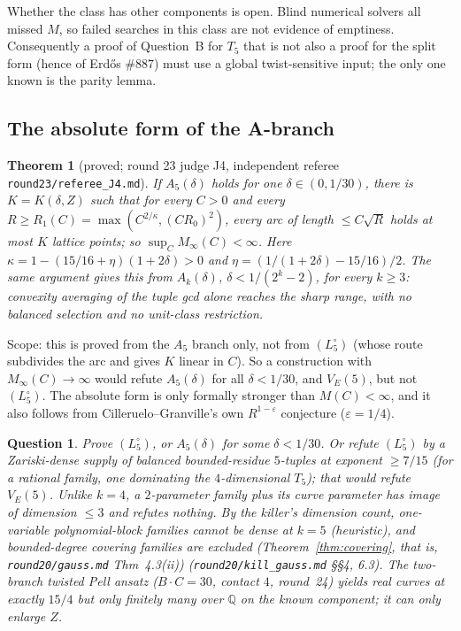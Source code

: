 \documentclass[11pt]{article}
\newtheorem{theorem}{Theorem}[section]
\newtheorem{question}{Question}
\newcommand{\Q}{\mathbb Q}
\newcommand{\rec}[1]{\texttt{#1}}
\begin{document}
Whether the class has other components is open.  Blind numerical solvers all
missed \(M\), so failed searches in this class are not evidence of emptiness.
Consequently a proof of Question~B for \(T_5\) that is not also a proof for
the split form (hence of Erd\H{o}s \#887) must use a global twist-sensitive
input; the only one known is the parity lemma.

\subsection{The absolute form of the A-branch}

\begin{theorem}[proved; round 23 judge J4, independent referee \rec{round23/referee\_J4.md}]\label{thm:absolute}
If \(A_5(\delta)\) holds for one \(\delta\in(0,1/30)\), there is
\(K=K(\delta,Z)\) such that for every \(C>0\) and every
\(R\ge R_1(C)=\max(C^{2/\kappa},(CR_0)^2)\), every arc of length
\(\le C\sqrt R\) holds at most \(K\) lattice points; so
\(\sup_C M_\infty(C)<\infty\).  Here \(\kappa=1-(15/16+\eta)(1+2\delta)>0\)
and \(\eta=(1/(1+2\delta)-15/16)/2\).  The same argument gives this from
\(A_k(\delta)\), \(\delta<1/(2^k-2)\), for every \(k\ge3\): convexity averaging
of the tuple gcd alone reaches the sharp range, with no balanced selection and
no unit-class restriction.
\end{theorem}

Scope: this is proved from the \(A_5\) branch only, not from \((L_5^\circ)\)
(whose route subdivides the arc and gives \(K\) linear in \(C\)).  So a
construction with \(M_\infty(C)\to\infty\) would refute \(A_5(\delta)\) for all
\(\delta<1/30\), and \(V_E(5)\), but not \((L_5^\circ)\).  The absolute form is
only formally stronger than \(M(C)<\infty\), and it also follows from
Cilleruelo--Granville's own \(R^{1-\varepsilon}\) conjecture
(\(\varepsilon=1/4\)).

\begin{question}\label{q:B}
Prove \((L_5^\circ)\), or \(A_5(\delta)\) for some \(\delta<1/30\).  Or refute
\((L_5^\circ)\) by a Zariski-dense supply of balanced bounded-residue
\(5\)-tuples at exponent \(\ge7/15\) (for a rational family, one dominating
the \(4\)-dimensional \(T_5\)); that would refute \(V_E(5)\).  Unlike \(k=4\),
a \(2\)-parameter family plus its curve parameter has image of dimension
\(\le3\) and refutes nothing.  By the killer's dimension count, one-variable
polynomial-block families cannot be dense at \(k=5\) (\emph{heuristic}), and
bounded-degree covering families are excluded (Theorem~\ref{thm:covering},
that is, \rec{round20/gauss.md} Thm~4.3(ii)) (\rec{round20/kill\_gauss.md}
\S\S4, 6.3).  The two-branch twisted Pell ansatz (\(B\cdot C=30\), contact
\(4\), round~24) yields real curves at exactly \(15/4\) but only finitely many
over \(\Q\) on the known component; it can only enlarge \(Z\).
\end{question}
\end{document}

